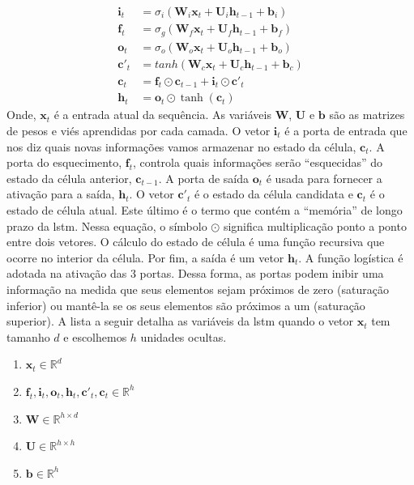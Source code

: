 \begin{equation}
\label{eq:lstm}
\begin{aligned}
\textbf{i}_t &= \sigma_{i}(\textbf{W}_i\textbf{x}_t + \textbf{U}_i\textbf{h}_{t-1} + \textbf{b}_i) \\
\textbf{f}_t &= \sigma_{g}(\textbf{W}_f\textbf{x}_t + \textbf{U}_f\textbf{h}_{t-1} + \textbf{b}_f) \\
\textbf{o}_t &= \sigma_{o}(\textbf{W}_o\textbf{x}_t + \textbf{U}_o\textbf{h}_{t-1} + \textbf{b}_o) \\   
\textbf{c}'_t &= tanh(\textbf{W}_c\textbf{x}_t + \textbf{U}_c\textbf{h}_{t-1} + \textbf{b}_c) \\
\textbf{c}_t &= \textbf{f}_t \odot \textbf{c}_{t-1} + \textbf{i}_t \odot \textbf{c}'_t \\
\textbf{h}_t & = \textbf{o}_t \odot \tanh(\textbf{c}_t)  
\end{aligned}
\end{equation}
Onde, $\textbf{x}_t$ é a entrada atual da sequência. As variáveis $\textbf{W}$, $\textbf{U}$ e $\textbf{b}$  são as matrizes de pesos e viés aprendidas por cada camada.  O vetor $\textbf{i}_{t}$ é a porta de entrada que nos diz quais novas informações vamos armazenar no estado da célula, $\textbf{c}_{t}$. 
A porta do esquecimento, $\textbf{f}_{t}$, controla quais informações serão ``esquecidas'' do estado da célula anterior, $\textbf{c}_{t-1}$. A porta de saída $\textbf{o}_{t}$ é usada para fornecer a ativação para a saída, $\textbf{h}_{t}$. O vetor $\textbf{c}'_{t}$ é o estado da célula candidata e $\textbf{c}_{t}$ é o estado de célula atual.  Este último é o termo que contém a ``memória'' de longo prazo da \acrshort{lstm}. Nessa equação, o símbolo $\odot$ significa multiplicação ponto a ponto entre dois vetores. O cálculo do estado de célula é uma função recursiva que ocorre no interior da célula. Por fim, a saída é um  vetor $\textbf{h}_{t}$.
A função logística é adotada na ativação das 3 portas.  Dessa forma, as portas podem inibir uma informação na medida que seus elementos sejam próximos de zero (saturação inferior) ou mantê-la se os seus elementos são próximos a um (saturação superior). A lista a seguir detalha as variáveis da \acrshort{lstm} quando o vetor $\textbf{x}_t$ tem tamanho $d$ e escolhemos $h$ unidades ocultas.    


\begin{enumerate}
	\item $\textbf{x}_t \in \mathbb{R}^{d}$
	\item $\textbf{f}_t,\textbf{i}_t,\textbf{o}_t,\textbf{h}_t,\textbf{c}'_t,\textbf{c}_t \in \mathbb{R}^{h}$ 
	\item $\textbf{W} \in \mathbb{R}^{h \times d} $
	\item $\textbf{U} \in \mathbb{R}^{h \times h}$
	\item $\textbf{b} \in \mathbb{R}^{h}$
\end{enumerate}

